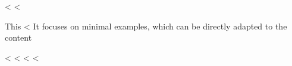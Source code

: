 \documentclass[
  numbers=noenddot,
  a4paper,  %
  twoside,  %
  bibliography=totoc,
  headsepline,
  cleardoublepage=empty,
  parskip=half,
  draft=false
]{scrbook}
\begin{document}
<%
<%
\label{chap:latexhints}

This <%
It focuses on minimal examples, which can be directly adapted to the content

<%
<%
<%
<%
\end{document}
